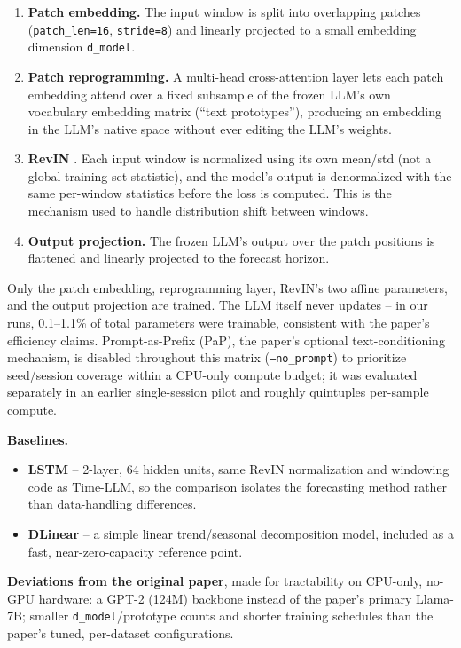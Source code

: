 \documentclass[11pt]{article}
\newcommand{\code}[1]{\texttt{#1}}
\begin{document}
\begin{enumerate}
  \item \textbf{Patch embedding.} The input window is split into overlapping
    patches (\code{patch\_len=16}, \code{stride=8}) and linearly projected
    to a small embedding dimension \code{d\_model}.
  \item \textbf{Patch reprogramming.} A multi-head cross-attention layer
    lets each patch embedding attend over a fixed subsample of the frozen
    LLM's own vocabulary embedding matrix (``text prototypes''), producing
    an embedding in the LLM's native space without ever editing the LLM's
    weights.
  \item \textbf{RevIN} \citep{kim2022revin}. Each input window is normalized
    using its own mean/std (not a global training-set statistic), and the
    model's output is denormalized with the same per-window statistics
    before the loss is computed. This is the mechanism used to handle
    distribution shift between windows.
  \item \textbf{Output projection.} The frozen LLM's output over the patch
    positions is flattened and linearly projected to the forecast horizon.
\end{enumerate}

Only the patch embedding, reprogramming layer, RevIN's two affine
parameters, and the output projection are trained. The LLM itself never
updates -- in our runs, 0.1--1.1\% of total parameters were trainable,
consistent with the paper's efficiency claims. Prompt-as-Prefix (PaP), the
paper's optional text-conditioning mechanism, is disabled throughout this
matrix (\code{--no\_prompt}) to prioritize seed/session coverage within a
CPU-only compute budget; it was evaluated separately in an earlier
single-session pilot and roughly quintuples per-sample compute.

\textbf{Baselines.}
\begin{itemize}
  \item \textbf{LSTM} -- 2-layer, 64 hidden units, same RevIN normalization
    and windowing code as Time-LLM, so the comparison isolates the
    forecasting method rather than data-handling differences.
  \item \textbf{DLinear} \citep{zeng2023dlinear} -- a simple linear
    trend/seasonal decomposition model, included as a fast, near-zero-capacity
    reference point.
\end{itemize}

\textbf{Deviations from the original paper}, made for tractability on
CPU-only, no-GPU hardware: a GPT-2 (124M) backbone instead of the paper's
primary Llama-7B; smaller \code{d\_model}/prototype counts and shorter
training schedules than the paper's tuned, per-dataset configurations.
\end{document}
